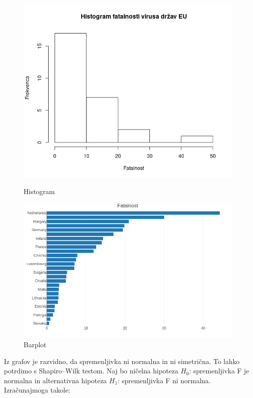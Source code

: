 \documentclass[a4paper,11pt]{article}
\begin{document}
\begin{figure}[!htb]
   \begin{minipage}{0.5\textwidth}
     \centering
     \includegraphics[width=1\linewidth]{histogram_fatalnost}
     \caption{Histogram}\label{Fig:Data1}
   \end{minipage}\hfill
   \begin{minipage}{0.5\textwidth}
     \centering
     \includegraphics[width=1\linewidth]{barplot_fatalnost}
     \caption{Barplot}\label{Fig:Data2}
   \end{minipage}
\end{figure}
Iz grafov je razvidno, da spremenljivka ni normalna in ni simetrična. To lahko potrdimo s Shapiro–Wilk testom. Naj bo ničelna hipoteza \(H_0\): spremenljivka F je normalna in alternativna hipoteza \(H_1\): spremenljivka F ni normalna. Izračunajmoga takole:
\end{document}
